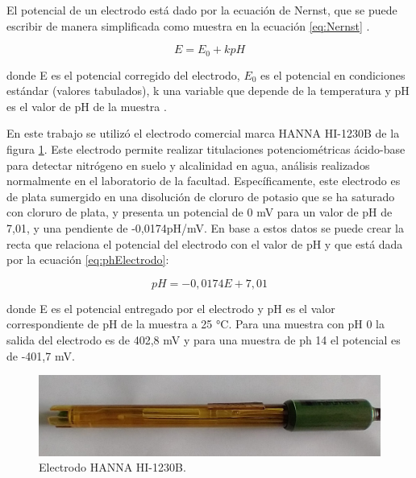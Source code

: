 
El potencial de un electrodo está dado por la ecuación de Nernst, que se puede
escribir de manera simplificada como muestra en la ecuación \ref{eq:Nernst} .

\begin{equation}
	\label{eq:Nernst}
E = E_{0} + k pH 
\end{equation}


donde E es el potencial corregido del electrodo, $E_{0}$ es el potencial en condiciones estándar (valores tabulados), k una variable que depende de la temperatura y pH es el valor de pH de la muestra \citep{ARTICLE:4}.

En este trabajo se utilizó el electrodo comercial marca HANNA HI-1230B de la figura \ref{fig:hi-1230b}. Este electrodo permite realizar titulaciones potenciométricas ácido-base para detectar nitrógeno en suelo y alcalinidad en agua, análisis realizados normalmente en el laboratorio de la facultad. Específicamente, este electrodo es de plata sumergido en una disolución de cloruro de potasio que se ha saturado con cloruro de plata, y presenta un potencial de 0 mV para un valor de pH de 7,01, y una pendiente de -0,0174pH/mV. En base a estos datos se puede crear la recta que relaciona el potencial del electrodo con el valor de pH y que está dada por la ecuación \ref{eq:phElectrodo}:

\begin{equation}
	\label{eq:phElectrodo}
pH = -0,0174 E + 7,01
\end{equation}

donde E es el potencial entregado por el electrodo y pH es el valor correspondiente de pH de la muestra a 25 °C. Para una muestra con pH 0 la salida del electrodo es de 402,8 mV y para una muestra de ph 14 el potencial es de -401,7 mV.

\begin{figure}[htbp]
	\centering
	\includegraphics[width=1.0\textwidth]{./Figures/hi-1230b.jpeg}
	\caption{Electrodo HANNA HI-1230B.}
	\label{fig:hi-1230b}
\end{figure}

